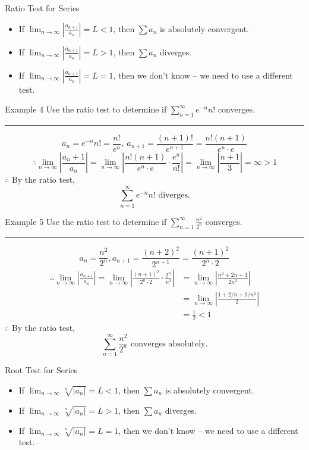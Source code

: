 \documentclass[12pt,a4paper]{article}
\begin{document}
\begin{thm}{Ratio Test for Series}
	\begin{itemize}
		\item If $\displaystyle\lim_{n\to\infty}\left|\frac{a_{n+1}}{a_n}\right|=L<1$, then $\displaystyle\sum{a_n}$ is absolutely convergent. 
		\item If $\displaystyle\lim_{n\to\infty}\left|\frac{a_{n+1}}{a_n}\right|=L>1$, then $\displaystyle\sum{a_n}$ diverges.
		\item If $\displaystyle\lim_{n\to\infty}\left|\frac{a_{n+1}}{a_n}\right|=L=1$, then we don't know -- we need to use a different test.  
	\end{itemize}	
\end{thm}
\begin{eg}{Example 4}
	Use the ratio test to determine if $\displaystyle\sum_{n=1}^\infty e^{-n}n!$ converges.\\
	\noindent\rule[0.25\baselineskip]{\textwidth}{1pt}	
	$$a_n=e^{-n}n!=\frac{n!}{e^n},\ a_{n+1}=\frac{(n+1)!}{e^{n+1}}=\frac{n!(n+1)}{e^n\cdot e}$$
	$$\therefore\lim_{n\to\infty}\left|\frac{a_n+1}{a_n}\right|=\lim_{n\to\infty}\left|\frac{n!(n+1)}{e^n\cdot e}\cdot\frac{e^n}{n!}\right|=\lim_{n\to\infty}\left|\frac{n+1}{3}\right|=\infty >1$$
	$\therefore$ By the ratio test, 
	$$\sum_{n=1}^\infty e^{-n}n!\text{ diverges.}$$
\end{eg}
\begin{eg}{Example 5}
	Use the ratio test to determine if $\displaystyle\sum_{n=1}^\infty\frac{n^2}{2^n}$ converges.\\
	\noindent\rule[0.25\baselineskip]{\textwidth}{1pt}
	$$a_n=\frac{n^2}{2^n}, a_{n+1}=\frac{(n+2)^2}{2^{n+1}}=\frac{(n+1)^2}{2^n\cdot 2}$$
	$$\begin{aligned}
		\therefore\lim_{n\to\infty}\left|\frac{a_{n+1}}{a_n}\right|=\lim_{n\to\infty}\left|\frac{(n+1)^2}{2^n\cdot 2}\cdot\frac{2^n}{n^2}\right|&=\lim_{n\to\infty}\left|\frac{n^2+2n+1}{2n^2}\right|\\
		&=\lim_{n\to\infty}\left|\frac{1+2/n+1/n^2}{2}\right|\\
		&=\frac{1}{2}<1
	\end{aligned}$$
	$\therefore$ By the ratio test, 
	$$\sum_{n=1}^\infty\frac{n^2}{2^n}\text{ converges absolutely.}$$
\end{eg}
\begin{thm}{Root Test for Series}
	\begin{itemize}
		\item If $\displaystyle\lim_{n\to\infty}\sqrt[n]{\left|{a_n}\right|}=L<1$, then $\displaystyle\sum{a_n}$ is absolutely convergent. 
		\item If $\displaystyle\lim_{n\to\infty}\sqrt[n]{\left|{a_n}\right|}=L>1$, then $\displaystyle\sum{a_n}$ diverges.
		\item If $\displaystyle\lim_{n\to\infty}\sqrt[n]{\left|{a_n}\right|}=L=1$, then we don't know -- we need to use a different test.  
	\end{itemize}	
\end{thm}
\end{document}
